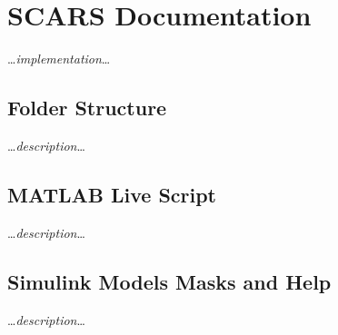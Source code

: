 \section{SCARS Documentation}\label{sec:documentation}
    \dots\textit{implementation}\dots
    
    \subsection{Folder Structure}
        \dots\textit{description}\dots
    
    \subsection{MATLAB Live Script}
        \dots\textit{description}\dots

    \subsection{Simulink Models Masks and Help}
        \dots\textit{description}\dots
